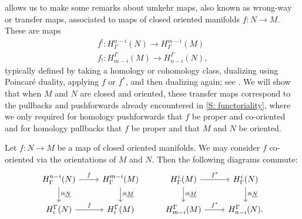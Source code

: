  allows us to make some remarks about umkehr maps, also known as wrong-way or transfer maps, associated to maps of closed oriented manifolds $f \colon N \to M$.
These are maps
\begin{align*}
	f^! \colon H^{n-i}_\Gamma(N) \to H^{m-i}_\Gamma(M)\\
	f_! \colon H_{m-i}^\Gamma(M) \to H_{n-i}^\Gamma(N),
\end{align*}
typically defined by taking a homology or cohomology class, dualizing using Poincar\'e duality, applying $f$ or $f^*$, and then dualizing again; see \cite[Definition VI.11.2]{Bred97}.
We will show that when $M$ and $N$ are closed and oriented, these transfer maps correspond to the pullbacks and pushforwards already encountered in \cref{S: functoriality}, where we only required for homology pushforwards that $f$ be proper and co-oriented and for homology pullbacks that $f$ be proper and that $M$ and $N$ be oriented.

\begin{proposition}
	Let $f \colon N \to M$ be a map of closed oriented manifolds.
	We may consider $f$ co-oriented via the orientations of $M$ and $N$.
	Then the following diagrams commute:
	\[
	\begin{tikzcd}
		H^{n-i}_\Gamma(N) \arrow{r}{f} \arrow[d, "\nplus \uN"] & H^{m-i}_\Gamma(M) \arrow[d, "\nplus \uM"] & H^{i}_\Gamma(M) \arrow{r}{f^*} \arrow[d, "\nplus \uM"] & H^{i}_\Gamma(N) \arrow[d, "\nplus \uN"] \\
		H_i^\Gamma(N) \arrow{r}{f} & H_i^\Gamma(M) & H_{m-i}^\Gamma(M) \arrow{r}{f^*} & H_{n-i}^\Gamma(N).
	\end{tikzcd}
	\]
\end{proposition}

